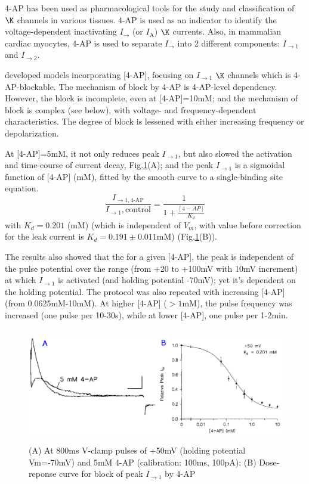 \begin{framed}
4-AP has been used as pharmacological tools for the study and
classification of $\K$ channels in various tissues. 4-AP is used as an
indicator to identify the voltage-dependent inactivating $I_\to$ (or
$I_\text{A}$) $\K$ currents. Also, in mammalian cardiac myocytes, 4-AP is used
to separate $I_\to$ into 2 different components: $I_{\to1}$ and $I_{\to2}$. 
\end{framed}


\citep{Campbell1993b} developed models incorporating [4-AP], focusing
on $I_{\to1}$ $\K$ channels which is 4-AP-blockable. The mechanism of block by
4-AP is 4-AP-level dependency. However, the block is incomplete, even at [4-AP]=10mM;
and the mechanism of block is complex (see below), with voltage- and
frequency-dependent characteristics. The degree of block is lessened with either
increasing frequency or depolarization.

At [4-AP]=5mM, it not only reduces peak $I_{\to1}$, but also slowed the
activation and time-course of current decay, Fig.\ref{fig:Ito1_4-AP}(A); and the
peak $I_{\to1}$ is a sigmoidal function of [4-AP] (mM), fitted by the smooth
curve to a single-binding site equation.
\begin{equation}
\frac{I_{\to1,\text{4-AP}}}{I_{\to1},\text{control}} =
\frac{1}{1+\frac{[4-AP]}{K_d}}
\end{equation}
with $K_d = 0.201$ (mM) (which is independent of $V_m$, with value before 
correction for the leak current is $K_d=0.191\pm 0.011$mM)
(Fig.\ref{fig:Ito1_4-AP}(B)).

The results also showed that the for a given [4-AP], the peak is independent of
the pulse potential over the range (from +20 to +100mV with 10mV increment) at
which $I_{\to1}$ is activated (and holding potential -70mV); yet it's dependent
on the holding potential. The protocol was also repeated with increasing [4-AP]
(from 0.0625mM-10mM). At higher [4-AP] ($>1$mM), the pulse frequency was
increased (one pulse per 10-30s), while at lower [4-AP], one pulse per 1-2min.

\begin{figure}[hbt]
 \centerline{\includegraphics[height=5cm, angle=0]{./images/Ito1_4-AP_campbell93.eps}}
\caption{(A) At 800ms V-clamp pulses of +50mV (holding potential Vm=-70mV) and
5mM 4-AP (calibration: 100ms, 100pA); (B) Dose-reponse curve for
block of peak $I_{\to1}$ by 4-AP \citep{Campbell1993}}
\label{fig:Ito1_4-AP}
\end{figure}

